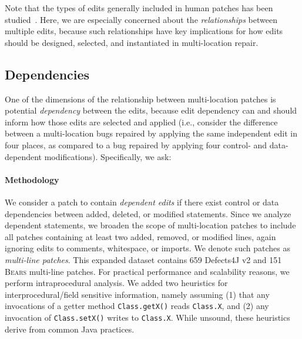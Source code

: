 \documentclass[10pt, conference]{IEEEtran}
\newcommand\bears{\textsc{Bears}\xspace}
\begin{document}
Note that the types of edits generally included in human patches has been
studied~\cite{examples}.  Here, we are especially
concerned about the 
\emph{relationships} between multiple edits, because such relationships have
key implications for how edits should be designed, selected, and instantiated 
in multi-location repair. 

\subsection{Dependencies}

One of the dimensions of the relationship between multi-location patches is potential
\emph{dependency} between the edits, because edit dependency can and should
inform how those edits are selected and applied (i.e., consider the difference
between a multi-location
bugs repaired by applying the same independent edit in four places, as
compared to a bug repaired by applying  four control- and data-dependent
modifications).  Specifically, we ask:


\paragraph{Methodology}
We consider a patch to contain \emph{dependent edits} if there exist 
control or data dependencies between added, deleted, or modified statements.
Since we analyze dependent statements, we broaden the scope of multi-location patches to 
include all patches containing at least two added, removed, or modified lines, 
again ignoring edits to comments, whitespace, or imports.
We denote such patches as \emph{multi-line patches}.
This expanded dataset contains 659 Defects4J v2 and 151 \bears 
multi-line patches.
For practical performance and scalability reasons, 
we perform intraprocedural analysis. We added two heuristics for
interprocedural/field sensitive
information, namely assuming (1) that any invocations of a getter
method  \texttt{Class.getX()} reads \texttt{Class.X}, and (2) any invocation of 
 \texttt{Class.setX()} writes to  \texttt{Class.X}.
%
While unsound, these heuristics derive from common Java
practices.
\end{document}
